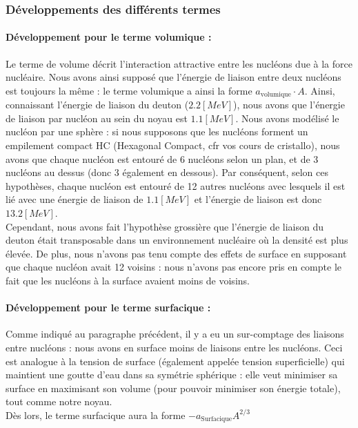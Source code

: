\subsubsection{Développements des différents termes}
\paragraph{Développement pour le terme volumique :}


Le terme de volume décrit l'interaction attractive entre les nucléons due à la force nucléaire. Nous avons ainsi supposé que l'énergie de liaison entre deux nucléons est toujours la même : le terme volumique a ainsi la forme $a_{\text{volumique}} \cdot A$. Ainsi, connaissant l'énergie de liaison du deuton ($2.2 [\si{MeV}]$), nous avons que l'énergie de liaison par nucléon au sein du noyau est $1.1 [\si{MeV}]$. Nous avons modélisé le nucléon par une sphère : si nous supposons que les nucléons forment un empilement compact HC (Hexagonal Compact, cfr vos cours de cristallo), nous avons que chaque nucléon est entouré de 6 nucléons selon un plan, et de 3 nucléons au dessus (donc 3 également en dessous). Par conséquent, selon ces hypothèses, chaque nucléon est entouré de 12 autres nucléons avec lesquels il est lié avec une énergie de liaison de $1.1 [\si{MeV}]$ et l'énergie de liaison est donc $13.2 [\si{MeV}]$.\\

Cependant, nous avons fait l'hypothèse grossière que l'énergie de liaison du deuton était transposable dans un environnement nucléaire où la densité est plus élevée. De plus, nous n'avons pas tenu compte des effets de surface en supposant que chaque nucléon avait 12 voisins : nous n'avons pas encore pris en compte le fait que les nucléons à la surface avaient moins de voisins.


\paragraph{Développement pour le terme surfacique :}


Comme indiqué au paragraphe précédent, il y a eu un sur-comptage des liaisons entre nucléons : nous avons en surface moins de liaisons entre les nucléons. Ceci est analogue à la tension de surface (également appelée tension superficielle) qui maintient une goutte d'eau dans sa symétrie sphérique : elle veut minimiser sa surface en maximisant son volume (pour pouvoir minimiser son énergie totale), tout comme notre noyau.\\
Dès lors, le terme surfacique aura la forme $- a_{\text{Surfacique}} A^{2/3} $



